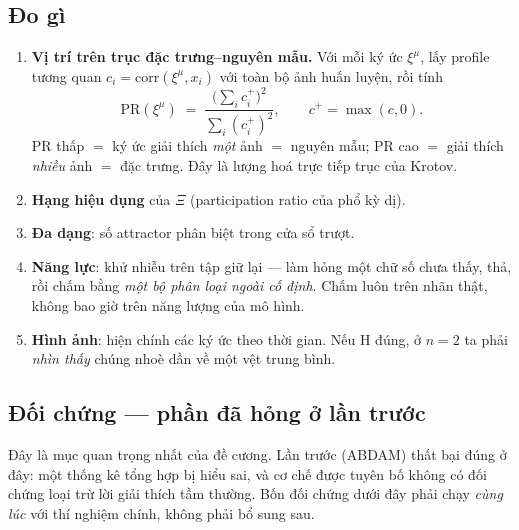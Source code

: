 \documentclass[11pt,a4paper]{article}
\newcommand{\warn}[1]{\par\vspace{1.5mm}\noindent\colorbox{warnbg}{\parbox{0.965\textwidth}{\vspace{1.2mm}#1\vspace{1.2mm}}}\vspace{1.5mm}}
\begin{document}
\subsection{Đo gì}

\begin{enumerate}[leftmargin=7mm,itemsep=1mm]
\item \textbf{Vị trí trên trục đặc trưng--nguyên mẫu.} Với mỗi ký ức $\xi^\mu$,
lấy profile tương quan $c_i=\mathrm{corr}(\xi^\mu,x_i)$ với toàn bộ ảnh huấn
luyện, rồi tính
\begin{equation}
\mathrm{PR}(\xi^\mu) \;=\; \frac{\big(\sum_i c_i^+\big)^2}{\sum_i (c_i^+)^2},
\qquad c^+=\max(c,0).
\end{equation}
$\mathrm{PR}$ thấp $=$ ký ức giải thích \emph{một} ảnh $=$ nguyên mẫu;
$\mathrm{PR}$ cao $=$ giải thích \emph{nhiều} ảnh $=$ đặc trưng. Đây là lượng
hoá trực tiếp trục của Krotov.
\item \textbf{Hạng hiệu dụng} của $\Xi$ (participation ratio của phổ kỳ dị).
\item \textbf{Đa dạng}: số attractor phân biệt trong cửa sổ trượt.
\item \textbf{Năng lực}: khử nhiễu trên tập giữ lại --- làm hỏng một chữ số chưa
thấy, thả, rồi chấm bằng \emph{một bộ phân loại ngoài cố định}. Chấm luôn trên
nhãn thật, không bao giờ trên năng lượng của mô hình.
\item \textbf{Hình ảnh}: hiện chính các ký ức theo thời gian. Nếu H đúng, ở
$n=2$ ta phải \emph{nhìn thấy} chúng nhoè dần về một vệt trung bình.
\end{enumerate}

\subsection{Đối chứng --- phần đã hỏng ở lần trước}

\warn{Đây là mục quan trọng nhất của đề cương. Lần trước (ABDAM) thất bại đúng ở
đây: một thống kê tổng hợp bị hiểu sai, và cơ chế được tuyên bố không có đối
chứng loại trừ lời giải thích tầm thường. Bốn đối chứng dưới đây phải chạy
\emph{cùng lúc} với thí nghiệm chính, không phải bổ sung sau.}
\end{document}
